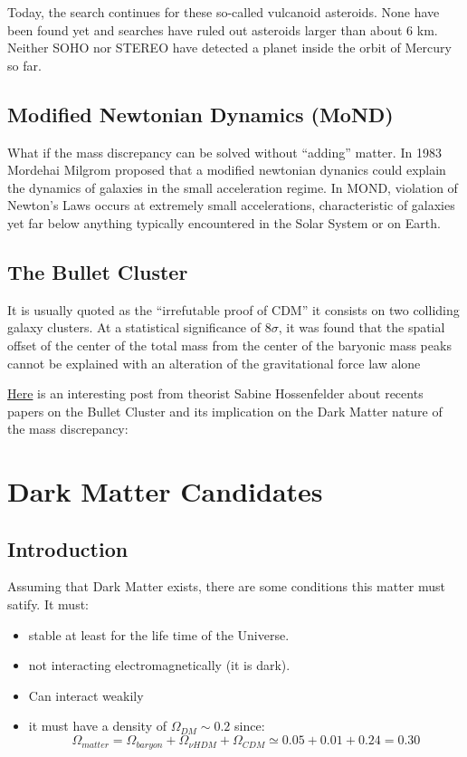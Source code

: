 \documentclass[
  letterpaper,
  DIV=11,
  numbers=noendperiod]{scrreprt}
\providecommand{\tightlist}{%
  \setlength{\itemsep}{0pt}\setlength{\parskip}{0pt}}\usepackage{longtable,booktabs,array}
\begin{document}
Today, the search continues for these so-called vulcanoid asteroids.
None have been found yet and searches have ruled out asteroids larger
than about 6 km. Neither SOHO nor STEREO have detected a planet inside
the orbit of Mercury so far.

\subsection{Modified Newtonian Dynamics
(MoND)}\label{modified-newtonian-dynamics-mond}

What if the mass discrepancy can be solved without ``adding'' matter. In
1983 Mordehai Milgrom proposed that a modified newtonian dynanics could
explain the dynamics of galaxies in the small acceleration regime. In
MOND, violation of Newton's Laws occurs at extremely small
accelerations, characteristic of galaxies yet far below anything
typically encountered in the Solar System or on Earth.

\subsection{The Bullet Cluster}\label{the-bullet-cluster}

It is usually quoted as the ``irrefutable proof of CDM'' it consists on
two colliding galaxy clusters. At a statistical significance of
8\(\sigma\), it was found that the spatial offset of the center of the
total mass from the center of the baryonic mass peaks cannot be
explained with an alteration of the gravitational force law alone

\href{http://backreaction.blogspot.be/2017/01/the-bullet-cluster-as-evidence-against.html}{Here}
is an interesting post from theorist Sabine Hossenfelder about recents
papers on the Bullet Cluster and its implication on the Dark Matter
nature of the mass discrepancy:

\section{Dark Matter Candidates}\label{dark-matter-candidates}

\subsection{Introduction}\label{introduction-3}

Assuming that Dark Matter exists, there are some conditions this matter
must satify. It must:

\begin{itemize}
\tightlist
\item
  stable at least for the life time of the Universe.
\item
  not interacting electromagnetically (it is dark).
\item
  Can interact weakily
\item
  it must have a density of \(\Omega_{DM} \sim 0.2\) since:
  \[\Omega_{matter} = \Omega_{baryon} + \Omega_{\nu HDM} + \Omega_{CDM} \simeq 0.05 + 0.01 + 0.24 = 0.30 \]
\end{itemize}
\end{document}
